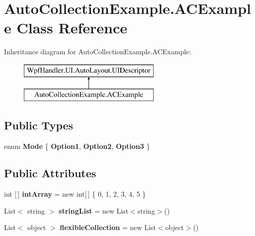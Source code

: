 \hypertarget{class_auto_collection_example_1_1_a_c_example}{}\section{Auto\+Collection\+Example.\+A\+C\+Example Class Reference}
\label{class_auto_collection_example_1_1_a_c_example}
Inheritance diagram for Auto\+Collection\+Example.\+A\+C\+Example\+:\begin{figure}[H]
\begin{center}
\leavevmode
\includegraphics[height=2.000000cm]{d4/d74/class_auto_collection_example_1_1_a_c_example}
\end{center}
\end{figure}
\subsection*{Public Types}
\begin{DoxyCompactItemize}
\item 
\mbox{\label{class_auto_collection_example_1_1_a_c_example_ac23d0ed28a355bb68653cd3fe8fa3b5d}} 
enum {\bfseries Mode} \{ {\bfseries Option1}, 
{\bfseries Option2}, 
{\bfseries Option3}
 \}
\end{DoxyCompactItemize}
\subsection*{Public Attributes}
\begin{DoxyCompactItemize}
\item 
\mbox{\label{class_auto_collection_example_1_1_a_c_example_a869431f180c6b467bec789cf07ad708e}} 
int \mbox{[}$\,$\mbox{]} {\bfseries int\+Array} = new int\mbox{[}$\,$\mbox{]} \{ 0, 1, 2, 3, 4, 5 \}
\item 
\mbox{\label{class_auto_collection_example_1_1_a_c_example_a81663228d45c0ee8315e81e01f60a1de}} 
List$<$ string $>$ {\bfseries string\+List} = new List$<$string$>$()
\item 
\mbox{\label{class_auto_collection_example_1_1_a_c_example_af2325cda8db2de9618385a109ccbabf0}} 
List$<$ object $>$ {\bfseries flexible\+Collection} = new List$<$object$>$()
\end{DoxyCompactItemize}
